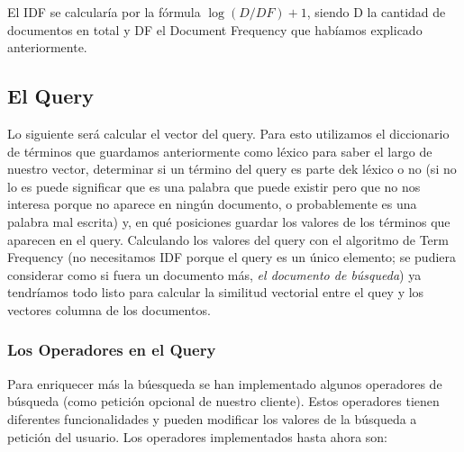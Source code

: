 \documentclass[12pt]{article}
\begin{document}
	El IDF se calcularía por la fórmula $\log(D/DF)+1$, siendo D la cantidad de documentos en total y DF el Document Frequency que habíamos explicado anteriormente.
	 
\subsection*{El Query}
	Lo siguiente será calcular el vector del query.
	Para esto utilizamos el diccionario de términos que guardamos anteriormente como léxico para saber el largo de nuestro vector, determinar si un término del query es parte dek léxico o no (si no lo es puede significar que es una palabra que puede existir pero que no nos interesa porque no aparece en ningún documento, o probablemente es una palabra mal escrita) y, en qué posiciones guardar los valores de los términos que aparecen en el query.
	Calculando los valores del query con el algoritmo de Term Frequency (no necesitamos IDF porque el query es un único elemento; se pudiera considerar como si fuera un documento más, \textit{el documento de búsqueda}) ya tendríamos todo listo para calcular la similitud vectorial entre el quey y los vectores columna de los documentos.
	
\subsubsection*{Los Operadores en el Query}
	Para enriquecer más la búesqueda se han implementado algunos operadores de búsqueda  (como petición opcional de nuestro cliente).
	Estos operadores tienen diferentes funcionalidades y pueden modificar los valores de la búsqueda a petición del usuario.
	Los operadores implementados hasta ahora son:
	
\end{document}
